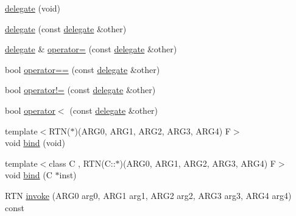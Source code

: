 \begin{DoxyCompactItemize}
\item 
\hyperlink{classcrap_1_1delegate_3_01_r_t_n_07_a_r_g0_00_01_a_r_g1_00_01_a_r_g2_00_01_a_r_g3_00_01_a_r_g4_08_4_a020f1ae4148520d946c6642a2e4f691b}{delegate} (void)
\item 
\hyperlink{classcrap_1_1delegate_3_01_r_t_n_07_a_r_g0_00_01_a_r_g1_00_01_a_r_g2_00_01_a_r_g3_00_01_a_r_g4_08_4_a6fef30ad579b299274ad6fee83fd9846}{delegate} (const \hyperlink{classcrap_1_1delegate}{delegate} \&other)
\item 
\hyperlink{classcrap_1_1delegate}{delegate} \& \hyperlink{classcrap_1_1delegate_3_01_r_t_n_07_a_r_g0_00_01_a_r_g1_00_01_a_r_g2_00_01_a_r_g3_00_01_a_r_g4_08_4_a141e1bfd2472f019b88c957412e77872}{operator=} (const \hyperlink{classcrap_1_1delegate}{delegate} \&other)
\item 
bool \hyperlink{classcrap_1_1delegate_3_01_r_t_n_07_a_r_g0_00_01_a_r_g1_00_01_a_r_g2_00_01_a_r_g3_00_01_a_r_g4_08_4_adcb008f255cd2061961906d79c5f284d}{operator==} (const \hyperlink{classcrap_1_1delegate}{delegate} \&other)
\item 
bool \hyperlink{classcrap_1_1delegate_3_01_r_t_n_07_a_r_g0_00_01_a_r_g1_00_01_a_r_g2_00_01_a_r_g3_00_01_a_r_g4_08_4_a3b6e7035bc986ac76a38e79de1fc8af5}{operator!=} (const \hyperlink{classcrap_1_1delegate}{delegate} \&other)
\item 
bool \hyperlink{classcrap_1_1delegate_3_01_r_t_n_07_a_r_g0_00_01_a_r_g1_00_01_a_r_g2_00_01_a_r_g3_00_01_a_r_g4_08_4_af16e21d0b908f3629e6125246d17e09d}{operator$<$} (const \hyperlink{classcrap_1_1delegate}{delegate} \&other)
\item 
{\footnotesize template$<$R\+T\+N($\ast$)(\+A\+R\+G0, A\+R\+G1, A\+R\+G2, A\+R\+G3, A\+R\+G4) F$>$ }\\void \hyperlink{classcrap_1_1delegate_3_01_r_t_n_07_a_r_g0_00_01_a_r_g1_00_01_a_r_g2_00_01_a_r_g3_00_01_a_r_g4_08_4_a70c860dd0cb7e5d2d68030b0b68e64ee}{bind} (void)
\item 
{\footnotesize template$<$class C , R\+T\+N(\+C\+::$\ast$)(\+A\+R\+G0, A\+R\+G1, A\+R\+G2, A\+R\+G3, A\+R\+G4) F$>$ }\\void \hyperlink{classcrap_1_1delegate_3_01_r_t_n_07_a_r_g0_00_01_a_r_g1_00_01_a_r_g2_00_01_a_r_g3_00_01_a_r_g4_08_4_a55e944a563058504872fd920106c1de4}{bind} (C $\ast$inst)
\item 
R\+T\+N \hyperlink{classcrap_1_1delegate_3_01_r_t_n_07_a_r_g0_00_01_a_r_g1_00_01_a_r_g2_00_01_a_r_g3_00_01_a_r_g4_08_4_a82cd0e7f8cdd9e243fd38891b01b9392}{invoke} (A\+R\+G0 arg0, A\+R\+G1 arg1, A\+R\+G2 arg2, A\+R\+G3 arg3, A\+R\+G4 arg4) const 
\end{DoxyCompactItemize}


